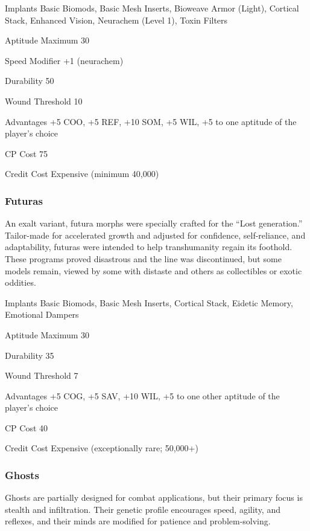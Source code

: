 \begin{description*}
\item[Implants] Basic Biomods, Basic Mesh Inserts, Bioweave Armor (Light),
  Cortical Stack, Enhanced Vision, Neurachem (Level 1), Toxin Filters
\item[Aptitude Maximum] 30  
\item[Speed Modifier] +1 (neurachem) 
\item[Durability] 50 
\item[Wound Threshold] 10 
\item[Advantages] +5 COO, +5 REF, +10 SOM, +5 WIL, +5 to one aptitude of the
  player’s choice
\item[CP Cost] 75 
\item[Credit Cost] Expensive (minimum 40,000) 
\end{description*}

\subsubsection{Futuras}
An exalt variant, futura morphs were specially crafted for the “Lost
generation.” Tailor-made for accelerated growth and adjusted for confidence,
self-reliance, and adaptability, futuras were intended to help transhumanity
regain its foothold. These programs proved disastrous and the line was
discontinued, but some models remain, viewed by some with distaste and others
as collectibles or exotic oddities.

\begin{description*}
\item[Implants] Basic Biomods, Basic Mesh Inserts, Cortical Stack, Eidetic
  Memory, Emotional Dampers
\item[Aptitude Maximum] 30 
\item[Durability] 35 
\item[Wound Threshold] 7 
\item[Advantages] +5 COG, +5 SAV, +10 WIL, +5 to one other aptitude of the
  player’s choice
\item[CP Cost] 40 
\item[Credit Cost] Expensive (exceptionally rare; 50,000+) 
\end{description*}

\subsubsection{Ghosts}
Ghosts are partially designed for combat applications, but their primary focus
is stealth and infiltration.  Their genetic profile encourages speed, agility,
and reflexes, and their minds are modified for patience and problem-solving.

